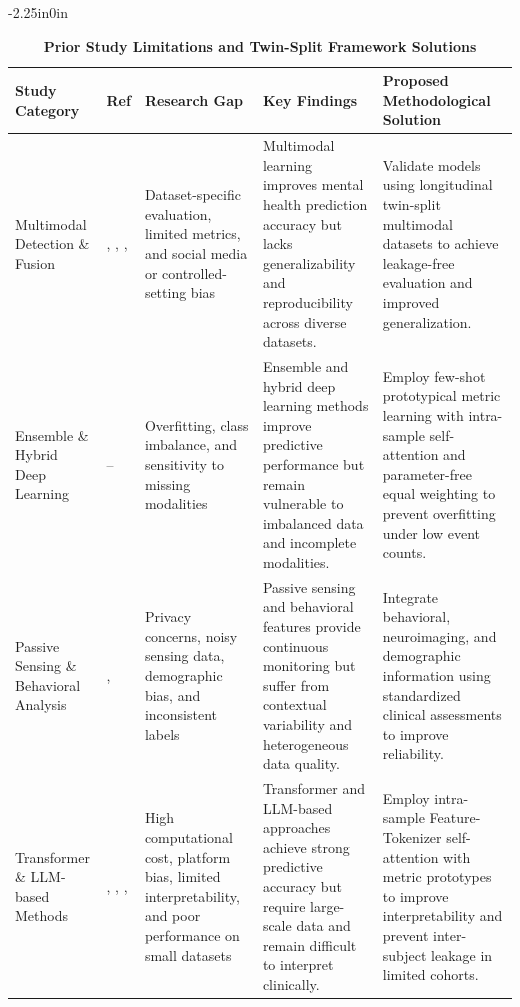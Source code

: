 \documentclass[10pt,letterpaper]{article}
\begin{document}
\begin{table}[!t]
\begin{adjustwidth}{-2.25in}{0in}
\centering
\caption{\textbf{Prior Study Limitations and Twin-Split Framework Solutions}}
\label{tab:prior_limitations}
\footnotesize
\renewcommand{\arraystretch}{1.15}

\begin{tabular}{|p{2.8cm}|p{2.0cm}|p{3.8cm}|p{4.5cm}|p{4.8cm}|}
\hline
\textbf{Study Category} & \textbf{Ref} & \textbf{Research Gap} & \textbf{Key Findings} & \textbf{Proposed Methodological Solution} \\
\hline

Multimodal Detection \& Fusion
& \cite{ref1}, \cite{ref2}, \cite{ref3}, \cite{ref4}
& Dataset-specific evaluation, limited metrics, and social media or controlled-setting bias
& Multimodal learning improves mental health prediction accuracy but lacks generalizability and reproducibility across diverse datasets.
& Validate models using longitudinal twin-split multimodal datasets to achieve leakage-free evaluation and improved generalization. \\
\hline

Ensemble \& Hybrid Deep Learning
& \cite{ref5}--\cite{ref8}
& Overfitting, class imbalance, and sensitivity to missing modalities
& Ensemble and hybrid deep learning methods improve predictive performance but remain vulnerable to imbalanced data and incomplete modalities.
& Employ few-shot prototypical metric learning with intra-sample self-attention and parameter-free equal weighting to prevent overfitting under low event counts. \\
\hline

Passive Sensing \& Behavioral Analysis
& \cite{ref9}, \cite{ref12}
& Privacy concerns, noisy sensing data, demographic bias, and inconsistent labels
& Passive sensing and behavioral features provide continuous monitoring but suffer from contextual variability and heterogeneous data quality.
& Integrate behavioral, neuroimaging, and demographic information using standardized clinical assessments to improve reliability. \\
\hline

Transformer \& LLM-based Methods
& \cite{ref16}, \cite{ref17}, \cite{ref20}, \cite{ref21}
& High computational cost, platform bias, limited interpretability, and poor performance on small datasets
& Transformer and LLM-based approaches achieve strong predictive accuracy but require large-scale data and remain difficult to interpret clinically.
& Employ intra-sample Feature-Tokenizer self-attention with metric prototypes to improve interpretability and prevent inter-subject leakage in limited cohorts. \\
\hline


\end{tabular}
\end{adjustwidth}
\end{table}
\end{document}
